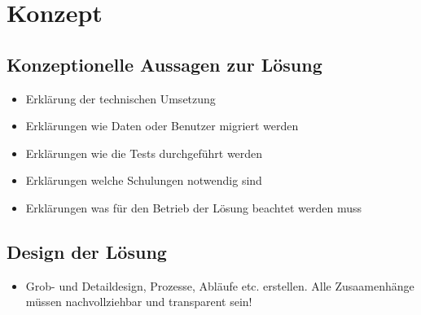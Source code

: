 \section{Konzept} 
\label{sec:Konzept}

\subsection{Konzeptionelle Aussagen zur Lösung}
\begin{itemize}
	\item Erklärung der technischen Umsetzung
	\item Erklärungen wie Daten oder Benutzer migriert werden
	\item Erklärungen wie die Tests durchgeführt werden
	\item Erklärungen welche Schulungen notwendig sind
	\item Erklärungen was für den Betrieb der Lösung beachtet werden muss
\end{itemize}

\subsection{Design der Lösung}
\begin{itemize}
	\item Grob- und Detaildesign, Prozesse, Abläufe etc. erstellen. Alle Zusaamenhänge müssen nachvollziehbar und transparent sein!
\end{itemize}

